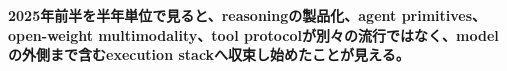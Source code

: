 \noindent\textbf{2025年前半を半年単位で見ると、reasoningの製品化、agent primitives、open-weight multimodality、tool protocolが別々の流行ではなく、modelの外側まで含むexecution stackへ収束し始めたことが見える。}\autocite{src-421ee9af3f80,src-4ec03078d316,src-78593f4b387f}
